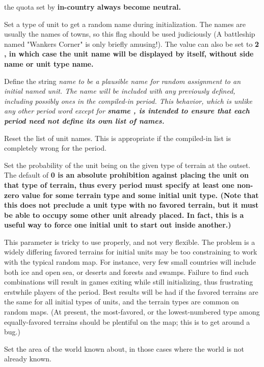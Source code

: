 \begin{description}
the quota set by %
\bf in-country \rm%
always become neutral.
\item[{%
\it bool}]
Set a type of unit to get a random name during initialization.  The
names are usually the names of towns,
so this flag should be used judiciously
(A battleship named "Wankers Corner" is only briefly amusing!).
The value can also be set to %
\bf 2\rm%
, in which case the unit name
will be displayed by itself, without side name or unit type name.
\item[{%
\it name}]
Define the string %
\it name \rm%
to be a plausible name for random assignment
to an initial named unit.  The name will be included with any previously
defined, including possibly ones in the compiled-in period.
This behavior, which is unlike any other period word except for %
\bf sname\rm%
,
is intended to ensure that each period need not define its own list of
names.
\item[{%
\bf clear-unit-names%
\rm }]
Reset the list of unit names.  This is appropriate if the compiled-in list
is completely wrong for the period.
\item[{%
\it n\%}]
Set the probability of the unit being on the given type of terrain at the
outset.  The default of %
\bf 0 \rm%
is an absolute prohibition against placing
the unit on that type of terrain, thus every period must specify at least
one non-zero value for some terrain type and some initial unit type.
(Note that this does not preclude a unit type with no favored terrain,
but it must be able to occupy some other unit already placed.  In fact,
this is a useful way to force one initial unit to start out inside another.)
\item
This parameter is tricky to use properly, and not very flexible.  The problem
is a widely differing favored terrains for initial units may be too
constraining to work with the typical random map.  For instance, very few
small countries will include both ice and open sea, or deserts and forests
and swamps.  Failure to find such combinations will result in games exiting
while still initializing, thus frustrating erstwhile players of the period.
Best results will be had if the favored terrains are the same for all initial
types of units, and the terrain types are common on random maps.
(At present, the most-favored, or the lowest-numbered type among
equally-favored terrains should be plentiful on the map;
this is to get around a bug.)
\item[{%
\it n}]
Set the area of the world known about, in those cases where the world is not
already known.  %

\end{description}
